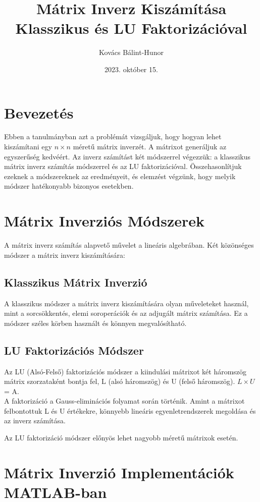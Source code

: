 \documentclass{article}
\title{Mátrix Inverz Kiszámítása Klasszikus és LU Faktorizációval}
\author{Kovács Bálint-Hunor}
\date{2023. október 15.}
\begin{document}
\maketitle

\section{Bevezetés}
Ebben a tanulmányban azt a problémát vizsgáljuk, hogy hogyan lehet kiszámítani
egy $n \times n$ méretű mátrix inverzét. A mátrixot generáljuk az egyszerűség
kedvéért. Az inverz számítást két módszerrel végezzük: a klasszikus mátrix
inverz számítás módszerrel és az LU faktorizációval. Összehasonlítjuk ezeknek a
módszereknek az eredményeit, és elemzést végzünk, hogy melyik módszer
hatékonyabb bizonyos esetekben.

\section{Mátrix Inverziós Módszerek}
A mátrix inverz számítás alapvető művelet a lineáris algebrában. Két közönséges
módszer a mátrix inverz kiszámítására:

\subsection{Klasszikus Mátrix Inverzió}
A klasszikus módszer a mátrix inverz kiszámítására olyan műveleteket használ,
mint a sorcsökkentés, elemi soroperációk és az adjugált mátrix számítása. Ez a
módszer széles körben használt és könnyen megvalósítható.

\subsection{LU Faktorizációs Módszer}
Az LU (Alsó-Felső) faktorizációs módszer a kiindulási mátrixot két háromszög
mátrix szorzataként bontja fel, L (alsó háromszög) és U (felső háromszög). $L
    \times U$ = A. \\ A faktorizáció a Gauss-eliminációs folyamat során történik.
Amint a mátrixot felbontottuk L és U értékekre, könnyebb lineáris
egyenletrendszerek megoldása és az inverz számítása.

Az LU faktorizáció módszer előnyös lehet nagyobb méretű mátrixok esetén.

\section{Mátrix Inverzió Implementációk MATLAB-ban}
\end{document}

